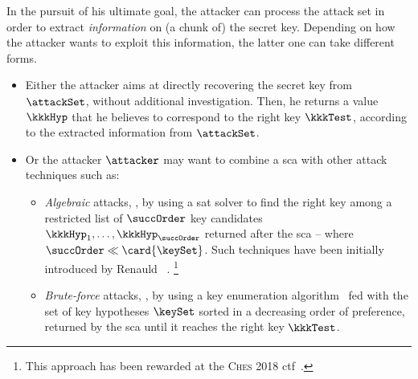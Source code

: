In the pursuit of his ultimate goal, the attacker can process the attack set in order to extract \emph{information} on (a chunk of) the secret key.
Depending on how the attacker wants to exploit this information, the latter one can take different forms.
\begin{itemize}
    \item Either the attacker aims at directly recovering the secret key from \(\attackSet\), without additional investigation.
    Then, he returns a value \(\kkkHyp\) that he believes to correspond to the right key \(\kkkTest\), according to the extracted information from \(\attackSet\).
    \item Or the attacker \(\attacker\) may want to combine a \gls{sca} with other attack techniques such as:
    \begin{itemize}
        \item \emph{Algebraic} attacks, \eg{}, by using a \gls{sat} solver to find the right key among a restricted list of \(\succOrder\) key candidates \(\kkkHyp_1, \ldots, \kkkHyp_\succOrder\) returned after the \gls{sca} -- where \(\succOrder \ll \card{\keySet}\).
        Such techniques have been initially introduced by Renauld \etal{}~\cite{renauld_algebraic_2009,renauld_aes_2009}.%
        \footnote{
            This approach has been rewarded at the \textsc{Ches} 2018 \gls{ctf}~\cite{gohr_ches_2019,hu_machine_2019,gohr_efficient_2020}.
        }
        \item \emph{Brute-force} attacks, \eg{}, by using a key enumeration algorithm~\cite{veyrat-charvillon_optimal_2012,martin_counting_2015,bogdanov_fast_2015,poussier_key_2018} fed with the set of key hypotheses \(\keySet\) sorted in a decreasing order of preference, returned by the \gls{sca} until it reaches the right key \(\kkkTest\).
    \end{itemize}
\end{itemize}

